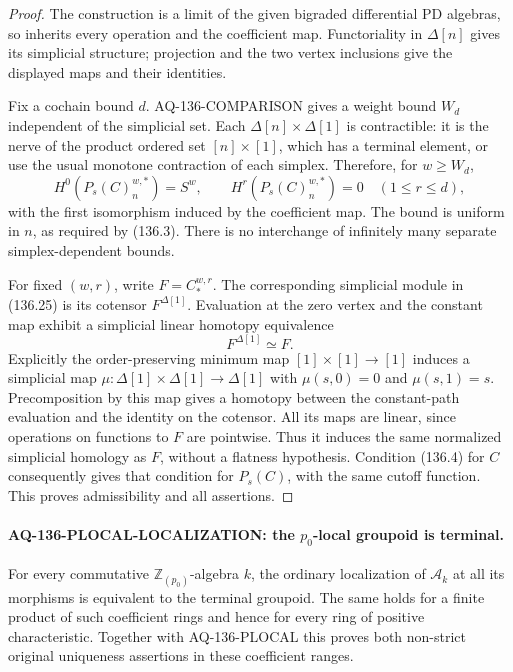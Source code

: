 \documentclass[11pt,a4paper]{article}
\theoremstyle{definition}\newtheorem{definition}[theorem]{Definition}
\theoremstyle{remark}\newtheorem{remark}[theorem]{Remark}
\begin{document}
\begin{proof}
The construction is a limit of the given bigraded differential
PD algebras, so inherits every operation and the coefficient
map.  Functoriality in $\Delta[n]$ gives its simplicial
structure; projection and the two vertex inclusions give
the displayed maps and their identities.

Fix a cochain bound $d$.  AQ-136-COMPARISON gives a weight
bound $W_d$ independent of the simplicial set.  Each
$\Delta[n]\times\Delta[1]$ is contractible: it is the nerve
of the product ordered set $[n]\times[1]$, which has a
terminal element, or use the usual monotone contraction of
each simplex.  Therefore, for $w\geq W_d$,
\[
 H^0(P_s(C)_n^{w,*})=S^w,\qquad
 H^r(P_s(C)_n^{w,*})=0\quad(1\leq r\leq d),                \tag{136.26}
\]
with the first isomorphism induced by the coefficient map.
The bound is uniform in $n$, as required by (136.3).
There is no interchange of infinitely many separate
simplex-dependent bounds.

For fixed $(w,r)$, write $F=C_*^{w,r}$.  The corresponding
simplicial module in (136.25) is its cotensor
$F^{\Delta[1]}$.  Evaluation at the zero vertex and the
constant map exhibit a simplicial linear homotopy
equivalence
\[
                       F^{\Delta[1]}\simeq F.              \tag{136.27}
\]
Explicitly the order-preserving minimum map
$[1]\times[1]\to[1]$ induces a simplicial map
$\mu:\Delta[1]\times\Delta[1]\to\Delta[1]$
with $\mu(s,0)=0$ and $\mu(s,1)=s$.
Precomposition by this map gives a homotopy between the
constant-path evaluation and the identity on the cotensor.
All its maps are linear, since operations on functions to
$F$ are pointwise.  Thus it induces the same normalized
simplicial homology as $F$, without a flatness hypothesis.
Condition (136.4) for $C$ consequently gives that condition
for $P_s(C)$, with the same cutoff function.  This proves
admissibility and all assertions.
\end{proof}

\paragraph{AQ-136-PLOCAL-LOCALIZATION: the $p_0$-local groupoid is terminal.}
For every commutative $\mathbb Z_{(p_0)}$-algebra $k$, the
ordinary localization of $\mathcal A_k$ at all its morphisms
is equivalent to the terminal groupoid.  The same holds
for a finite product of such coefficient rings and hence
for every ring of positive characteristic.  Together with
AQ-136-PLOCAL this proves both non-strict original
uniqueness assertions in these coefficient ranges.
\end{document}

